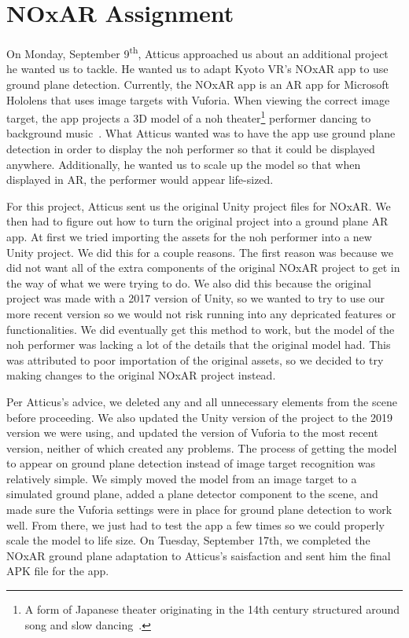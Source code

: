 \documentclass[a4paper, 10pt, american, titlepage]{article}
\begin{document}
\section{NOxAR Assignment}
\label{sec:NOxAR}

On Monday, September 9\textsuperscript{th}, Atticus approached us about an additional project he 
wanted us to tackle. He wanted us to adapt Kyoto VR's NOxAR app to use ground
plane detection. Currently, the NOxAR app is an AR app for Microsoft Hololens
that uses image targets with Vuforia. When viewing the correct image target,
the app projects a 3D model of a noh theater\footnote{A form of Japanese 
theater originating in the 14th century structured around song and slow 
dancing~\autocite{japanguide2018}.} performer dancing to background 
music~\autocite{noxar2018}. What Atticus wanted was to have the app use 
ground plane detection in order to display the noh performer so that it could 
be displayed anywhere. Additionally, he wanted us to scale up the model so that
when displayed in AR, the performer would appear life-sized. 

For this project, Atticus sent us the original Unity project files for NOxAR.
We then had to figure out how to turn the original project into a ground plane
AR app. At first we tried importing the assets for the noh performer into a new
Unity project. We did this for a couple reasons. The first reason was because
we did not want all of the extra components of the original NOxAR project to
get in the way of what we were trying to do. We also did this because the %
original project was made with a 2017 version of Unity, so we wanted to try to
use our more recent version so we would not risk running into any depricated 
features or functionalities. We did eventually get this method to work, but the
model of the noh performer was lacking a lot of the details that the original 
model had. This was attributed to poor importation of the original assets, so 
we decided to try making changes to the original NOxAR project instead. 

Per Atticus's advice, we deleted any and all unnecessary elements from the 
scene before proceeding. We also updated the Unity version of the project to
the 2019 version we were using, and updated the version of Vuforia to the most
recent version, neither of which created any problems. The process of getting
the model to appear on ground plane detection instead of image target 
recognition was relatively simple. We simply moved the model from an image 
target to a simulated ground plane, added a plane detector component to the
scene, and made sure the Vuforia settings were in place for ground plane
detection to work well. From there, we just had to test the app a few times so
we could properly scale the model to life size. On Tuesday, September 17th, 
we completed the NOxAR ground plane adaptation to Atticus's saisfaction and
sent him the final APK file for the app. 
\end{document}

